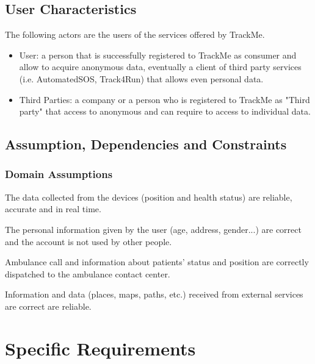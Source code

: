 \documentclass[a4paper]{article}
\begin{document}
\subsection{User Characteristics}
The following actors are the users of the services offered by TrackMe. 


\begin{itemize}
    \item User:  a person that is successfully registered to TrackMe as consumer and allow to acquire anonymous data, eventually a client of third party services (i.e. AutomatedSOS, Track4Run) that allows even personal data.
    
    \item Third Parties:  a company or a person who is registered to TrackMe as "Third party" that access to anonymous and can require to access to individual data.
\end{itemize}

\vspace{2cm}

\subsection{Assumption, Dependencies and Constraints}

\subsubsection{Domain Assumptions}

\begin{enumerate}[label={[D.\arabic*]}]
    
    \item The data collected from the devices (position and health status) are reliable, accurate and in real time.
    \item The personal information given by the user (age, address, gender...) are correct and the account is not used by other people. 
    \item Ambulance call and information about patients' status and position are correctly dispatched to the ambulance contact center.
    \item Information and data (places, maps, paths, etc.) received from external services are correct are reliable.
    
\end{enumerate}
\clearpage

\section{Specific Requirements}
\end{document}
